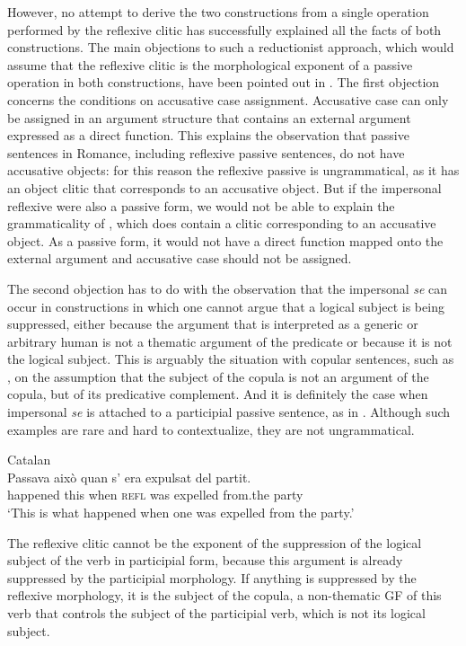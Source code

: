 \documentclass[output=paper,hidelinks]{langscibook}
\begin{document}
However, no attempt to derive the two constructions from a single operation performed by the reflexive clitic has successfully explained all the facts of both constructions. The main objections to such a reductionist approach, which would assume that the reflexive clitic is the morphological exponent of a passive operation in both constructions, have been pointed out in \citet{Yang2019}. The first objection concerns the conditions on accusative case assignment. Accusative case can only be assigned in an argument structure that contains an external argument expressed as a direct function. This explains the observation that passive sentences in Romance, including reflexive passive sentences, do not have accusative objects: for this reason the reflexive passive  is ungrammatical, as it has an object clitic that corresponds to an accusative object. But if the impersonal reflexive were also a passive form, we would not be able to explain the grammaticality of , which does contain a clitic corresponding to an accusative object. As a passive form, it would not have a direct function mapped onto the external argument and accusative case should not be assigned.

The second objection has to do with the observation that the impersonal \textit{se} can occur in constructions in which one cannot argue that a logical subject is being suppressed, either because the argument that is interpreted as a generic or arbitrary human is not a thematic argument of the predicate or because it is not the logical subject. This is arguably the situation with copular sentences, such as , on the assumption that the subject of the copula is not an argument of the copula, but of its predicative complement. And it is definitely the case when impersonal \textit{se} is attached to a participial passive sentence, as in . Although such examples are rare and hard to contextualize, they are not ungrammatical.

\ea\label{ex:Romance:48}  Catalan   \citep[895]{Catalans2016}\\
\gll Passava això quan s' era expulsat del partit.\\
happened this when \textsc{refl} was expelled from.the party\\
\glt`This is what happened when one was expelled from the party.'
\z

The reflexive clitic cannot be the exponent of the suppression of the logical subject of the verb in participial form, because this argument is already suppressed by the participial morphology. If anything is suppressed by the reflexive morphology, it is the subject of the copula, a non-thematic GF of this verb that controls the subject of the participial verb, which is not its logical subject.
\end{document}
